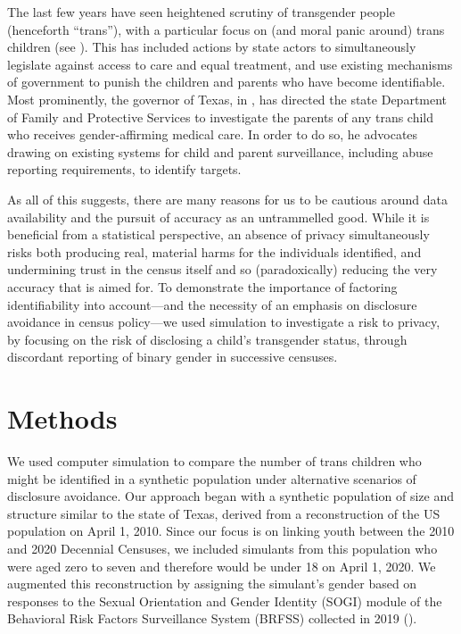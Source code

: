 \documentclass{jpc} %
\theoremstyle{plain}\newtheorem{satz}[thm]{Satz} %
\begin{document}
The last few years have seen heightened scrutiny of transgender people (henceforth ``trans''), with a particular focus on (and moral panic around) trans children (see \cite{slothouber2020trans}). This has included actions by state actors to simultaneously legislate against access to care and equal treatment, and use existing mechanisms of government to punish the children and parents who have become identifiable. Most prominently, the governor of Texas, in \cite{abbottletter}, has directed the state Department of Family and Protective Services to investigate the parents of any trans child who receives gender-affirming medical care. In order to do so, he advocates drawing on existing systems for child and parent surveillance, including abuse reporting requirements, to identify targets.

As all of this suggests, there are many reasons for us to be cautious around data availability and the pursuit of accuracy as an untrammelled good. While it is beneficial from a statistical perspective, an absence of privacy simultaneously risks both producing real, material harms for the individuals identified, and undermining trust in the census itself and so (paradoxically) reducing the very accuracy that is aimed for. To demonstrate the importance of factoring identifiability into account---and the necessity of an emphasis on disclosure avoidance in census policy---we used simulation to investigate a risk to privacy, by focusing on the risk of disclosing a child's transgender status, through discordant reporting of binary gender in successive censuses.

\section*{Methods}

We used computer simulation to compare the number of trans children who might be identified in a synthetic population under alternative scenarios of disclosure avoidance.  Our approach began with a synthetic population of size and structure similar to the state of Texas, derived from a reconstruction of the US population on April 1, 2010.  Since our focus is on linking youth between the 2010 and 2020 Decennial Censuses, we included simulants from this population who were aged zero to seven and therefore would be under 18 on April 1, 2020.  We augmented this reconstruction by assigning the simulant's gender based on responses to the Sexual Orientation and Gender Identity (SOGI) module of the Behavioral Risk Factors Surveillance System (BRFSS) collected in 2019 (\cite{brfss2019}). %
\end{document}
